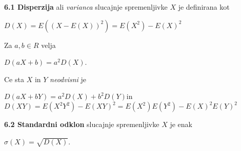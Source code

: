 \documentclass{article}
\begin{document}
\begin{multicols}{2}
\textbf{6.1 Disperzija} ali \textit{varianca} slucajnje spremenljivke $X$
je definirana kot
\begin{center}
    \begin{math}
        D(X) = E((X - E(X))^2) = E(X^2) - E(X)^2
    \end{math}
\end{center}
Za $a, b \in R$ velja
\begin{center}
    \begin{math}
        D(aX + b) = a^2 D(X)
    \end{math}.
\end{center} 
Ce sta $X$ in $Y$ \textit{neodvisni} je 
\begin{center}
    \begin{small}
        \begin{math}
            D(aX + bY) = a^2D(X) + b^2D(Y)
        \end{math}in
        \begin{math}
            D(XY) = E(X^2Y^2) - E(XY)^2 = E(X^2)E(Y^2) - E(X)^2E(Y)^2
        \end{math}
    \end{small}
\end{center}

\textbf{6.2 Standardni odklon} slucajnje spremenljivke $X$
je enak 
\begin{center}
    \begin{math}
        \sigma(X) = \sqrt{D(X)}
    \end{math}.
\end{center}


\end{multicols}
\end{document}
